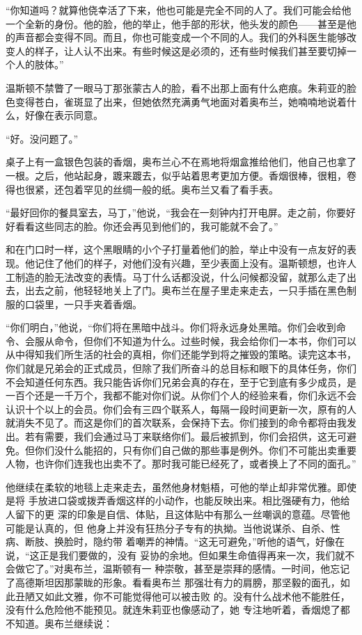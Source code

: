 ``你知道吗？就算他侥幸活了下来，他也可能是完全不同的人了。我们可能会给他一个全新的身份。他的脸，他的举止，他手部的形状，他头发的颜色——甚至是他的声音都会变得不同。而且，你也可能变成一个不同的人。我们的外科医生能够改变人的样子，让人认不出来。有些时候这是必须的，还有些时候我们甚至要切掉一个人的肢体。''

温斯顿不禁瞥了一眼马丁那张蒙古人的脸，看不出那上面有什么疤痕。朱莉亚的脸色变得苍白，雀斑显了出来，但她依然充满勇气地面对着奥布兰，她喃喃地说着什么，好像在表示同意。

``好。没问题了。''

桌子上有一盒银色包装的香烟，奥布兰心不在焉地将烟盒推给他们，他自己也拿了一根。之后，他站起身，踱来踱去，似乎站着思考更加方便。香烟很棒，很粗，卷得也很紧，还包着罕见的丝绸一般的纸。奥布兰又看了看手表。

``最好回你的餐具室去，马丁，''他说，``我会在一刻钟内打开电屏。走之前，你要好好看看这些同志的脸。你还会再见到他们的，我可能就不会了。''

和在门口时一样，这个黑眼睛的小个子打量着他们的脸，举止中没有一点友好的表现。他记住了他们的样子，对他们没有兴趣，至少表面上没有。温斯顿想，也许人工制造的脸无法改变的表情。马丁什么话都没说，什么问候都没留，就那么走了出去，出去之前，他轻轻地关上了门。奥布兰在屋子里走来走去，一只手插在黑色制服的口袋里，一只手夹着香烟。

``你们明白，''他说，``你们将在黑暗中战斗。你们将永远身处黑暗。你们会收到命令、会服从命令，但你们不知道为什么。过些时候，我会给你们一本书，你们可以从中得知我们所生活的社会的真相，你们还能学到将之摧毁的策略。读完这本书，你们就是兄弟会的正式成员，但除了我们所奋斗的总目标和眼下的具体任务，你们不会知道任何东西。我只能告诉你们兄弟会真的存在，至于它到底有多少成员，是一百个还是一千万个，我都不能对你们说。从你们个人的经验来看，你们永远不会认识十个以上的会员。你们会有三四个联系人，每隔一段时间更新一次，原有的人就消失不见了。而这是你们的首次联系，会保持下去。你们接到的命令都将由我发出。若有需要，我们会通过马丁来联络你们。最后被抓到，你们会招供，这无可避免。但你们没什么能招的，只有你们自己做的那些事是例外。你们不可能出卖重要人物，也许你们连我也出卖不了。那时我可能已经死了，或者换上了不同的面孔。''

他继续在柔软的地毯上走来走去，虽然他身材魁梧，可他的举止却非常优雅。即使是将
手放进口袋或拨弄香烟这样的小动作，也能反映出来。相比强硬有力，他给人留下的更
深的印象是自信、体贴，且这体贴中有那么一丝嘲讽的意蕴。尽管他可能是认真的，但
他身上并没有狂热分子专有的执拗。当他说谋杀、自杀、性病、断肢、换脸时，隐约带
着嘲弄的神情。``这无可避免，''听他的语气，好像在说，``这正是我们要做的，没有
妥协的余地。但如果生命值得再来一次，我们就不会做它了。''对奥布兰，温斯顿有一
种崇敬，甚至是崇拜的感情。一时间，他忘记了高德斯坦因那蒙眬的形象。看看奥布兰
那强壮有力的肩膀，那坚毅的面孔，如此丑陋又如此文雅，你不可能觉得他可以被击败
的。没有什么战术他不能胜任，没有什么危险他不能预见。就连朱莉亚也像感动了，她
专注地听着，香烟熄了都不知道。奥布兰继续说：

